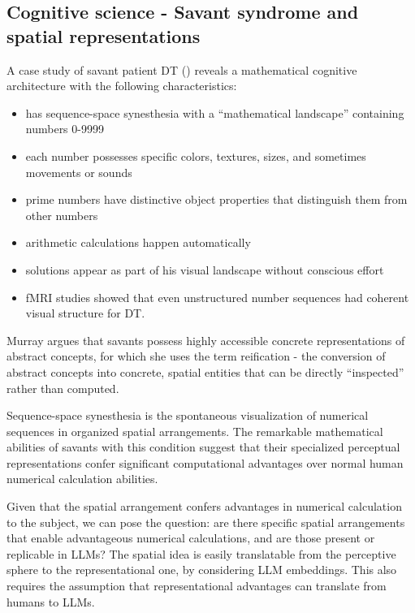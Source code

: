 \documentclass[
  a4paper, twoside, 10pt, titlepage]{book}
\providecommand{\tightlist}{%
  \setlength{\itemsep}{0pt}\setlength{\parskip}{0pt}}
\begin{document}
\subsection{Cognitive science - Savant syndrome and spatial
representations}\label{cognitive-science---savant-syndrome-and-spatial-representations}

A case study of savant patient DT () reveals a mathematical cognitive architecture with the following
characteristics:

\begin{itemize}
\tightlist
\item
  has sequence-space synesthesia with a ``mathematical landscape''
  containing numbers 0-9999
\item
  each number possesses specific colors, textures, sizes, and sometimes
  movements or sounds
\item
  prime numbers have distinctive object properties that distinguish them
  from other numbers
\item
  arithmetic calculations happen automatically
\item
  solutions appear as part of his visual landscape without conscious
  effort
\item
  fMRI studies showed that even unstructured number sequences had
  coherent visual structure for DT.
\end{itemize}

Murray argues that savants possess highly accessible concrete
representations of abstract concepts, for which she uses the term
reification - the conversion of abstract concepts into concrete, spatial
entities that can be directly ``inspected'' rather than computed.

Sequence-space synesthesia is the spontaneous visualization of numerical
sequences in organized spatial arrangements. The remarkable mathematical
abilities of savants with this condition suggest that their specialized
perceptual representations confer significant computational advantages
over normal human numerical calculation abilities.

Given that the spatial arrangement confers advantages in numerical
calculation to the subject, we can pose the question: are there specific
spatial arrangements that enable advantageous numerical calculations,
and are those present or replicable in LLMs? The spatial idea is easily
translatable from the perceptive sphere to the representational one, by
considering LLM embeddings. This also requires the assumption that
representational advantages can translate from humans to LLMs.
\end{document}
